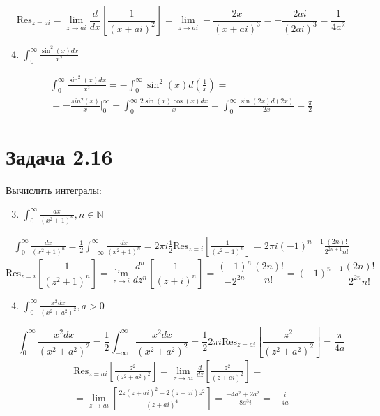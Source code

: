 \documentclass[11pt]{article}
\begin{document}
$$\mathrm{Res}_{z=ai} = \lim_{z \to ai}\frac{d}{dx}\left[\frac{1}{(x + ai)^2}\right] = \lim_{z \to ai}-\frac{2x}{(x + ai)^3} = -\frac{2ai}{(2ai)^3} = \frac{1}{4a^2}$$
\begin{enumerate}
\setcounter{enumi}{3}
\item \(\int_0^\infty\frac{\sin^2(x)dx}{x^2}\)
\end{enumerate}
\begin{multline*}
\int_0^\infty\frac{\sin^2(x)dx}{x^2} = -\int_0^\infty\sin^2(x)d\left(\frac{1}{x}\right) = \\
= -\frac{sin^2(x)}{x}\bigg|_0^\infty + \int_0^\infty\frac{2\sin(x)\cos(x)dx}{x} = \int_0^\infty\frac{\sin(2x)d(2x)}{2x} = \frac{\pi}{2}
\end{multline*}
\section{Задача 2.16}
\label{sec:orgb9c9957}
Вычислить интегралы:
\begin{enumerate}
\setcounter{enumi}{2}
\item \(\int_0^\infty\frac{dx}{(x^2 + 1)^n}, n \in \mathbb{N}\)
\end{enumerate}
\begin{multline*}
\int_0^\infty\frac{dx}{(x^2+1)^n} = \frac{1}{2}\int_{-\infty}^{\infty}\frac{dx}{(x^2+1)^n}
 = 2\pi i\frac{1}{2}\mathrm{Res}_{z=i}\left[\frac{1}{(z^2+1)^n}\right] = 2\pi i(-1)^{n-1}\frac{(2n)!}{2^{2n+1}n!}
\end{multline*}
$$\mathrm{Res}_{z=i}\left[\frac{1}{(z^2+1)^n}\right] = \lim_{z \to i}\frac{d^n}{dz^n}\left[\frac{1}{(z + i)^n}\right]
 = \frac{(-1)^n}{-2^{2n}}\frac{(2n)!}{n!} = (-1)^{n-1}\frac{(2n)!}{2^{2n}{n!}}$$
\begin{enumerate}
\setcounter{enumi}{3}
\item \(\int_0^\infty\frac{x^2dx}{(x^2+a^2)^2}, a > 0\)
\end{enumerate}
$$\int_0^\infty\frac{x^2dx}{(x^2+a^2)^2} = \frac{1}{2}\int_{-\infty}^\infty\frac{x^2dx}{(x^2+a^2)^2}
 = \frac{1}{2}2\pi i\mathrm{Res}_{z=ai}\left[\frac{z^2}{(z^2+a^2)^2}\right] = \frac{\pi}{4a}$$
\begin{multline*}
\mathrm{Res}_{z=ai}\left[\frac{z^2}{(z^2+a^2)^2}\right] = \lim_{z \to ai}\frac{d}{dz}\left[\frac{z^2}{(z+ai)^2}\right] = \\
 = \lim_{z\to ai}\left[\frac{2z(z+ai)^2 - 2(z+ai)z^2}{(z+ai)^4}\right] = \frac{-4a^2 + 2a^2}{-8a^3i} = -\frac{i}{4a}
\end{multline*}
\end{document}
